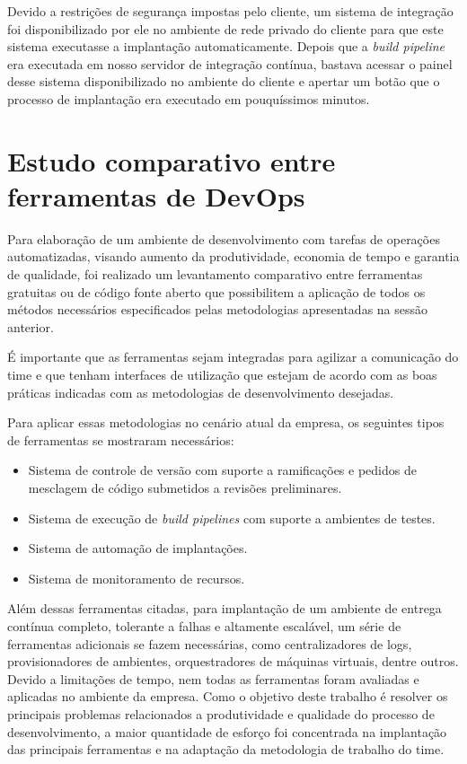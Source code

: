 \documentclass[
12pt,				%
openright,			%
oneside,			%
a4paper,			%
english,			%
french,				%
spanish,			%
brazil,				%
]{abntex2}
\begin{document}
Devido a restrições de segurança impostas pelo cliente, um sistema de integração foi disponibilizado por ele no ambiente de rede privado do cliente para que este sistema executasse a implantação automaticamente. Depois que a \textit{build pipeline} era executada em nosso servidor de integração contínua, bastava acessar o painel desse sistema disponibilizado no ambiente do cliente e apertar um botão que o processo de implantação era executado em pouquíssimos minutos.

\section{Estudo comparativo entre ferramentas de DevOps}

Para elaboração de um ambiente de desenvolvimento com tarefas de operações automatizadas, visando aumento da produtividade, economia de tempo e garantia de qualidade, foi realizado um levantamento comparativo entre ferramentas gratuitas ou de código fonte aberto que possibilitem a aplicação de todos os métodos necessários especificados pelas metodologias apresentadas na sessão anterior.

É importante que as ferramentas sejam integradas para agilizar a comunicação do time e que tenham interfaces de utilização que estejam de acordo com as boas práticas indicadas com as metodologias de desenvolvimento desejadas.

Para aplicar essas metodologias no cenário atual da empresa, os seguintes tipos de ferramentas se mostraram necessários:

\begin{itemize}
	\item Sistema de controle de versão com suporte a ramificações e pedidos de mesclagem de código submetidos a revisões preliminares.
	\item Sistema de execução de \textit{build pipelines} com suporte a ambientes de testes.
	\item Sistema de automação de implantações.
	\item Sistema de monitoramento de recursos.
\end{itemize}

Além dessas ferramentas citadas, para implantação de um ambiente de entrega contínua completo, tolerante a falhas e altamente escalável, um série de ferramentas adicionais se fazem necessárias, como centralizadores de logs, provisionadores de ambientes, orquestradores de máquinas virtuais, dentre outros. Devido a limitações de tempo, nem todas as ferramentas foram avaliadas e aplicadas no ambiente da empresa. Como o objetivo deste trabalho é resolver os principais problemas relacionados a produtividade e qualidade do processo de desenvolvimento, a maior quantidade de esforço foi concentrada na implantação das principais ferramentas e na adaptação da metodologia de trabalho do time.
\end{document}
